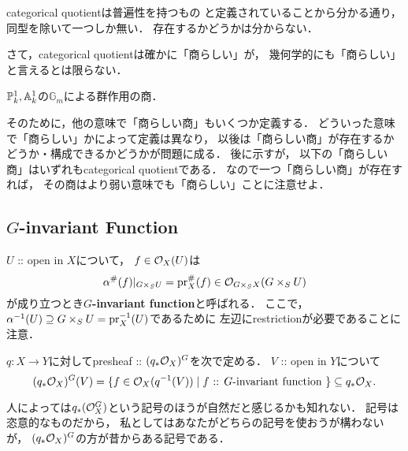 \documentclass[a4paper]{jsarticle}
\newcommand{\Gm}{\mathbb{G}_m}
\begin{document}
    \begin{Remark}
        categorical quotientは普遍性を持つもの
        と定義されていることから分かる通り，
        同型を除いて一つしか無い．
        存在するかどうかは分からない．
    \end{Remark}

    さて，categorical quotientは確かに「商らしい」が，
    幾何学的にも「商らしい」と言えるとは限らない．

    \begin{Example}\label{example:P,A/Gm}
        $\mathbb{P}^1_k, \mathbb{A}^1_k$の$\Gm$による群作用の商．
    \end{Example}

    そのために，他の意味で「商らしい商」もいくつか定義する．
    どういった意味で「商らしい」かによって定義は異なり，
    以後は「商らしい商」が存在するかどうか・構成できるかどうかが問題に成る．
    後に示すが，
    以下の「商らしい商」はいずれもcategorical quotientである．
    なので一つ「商らしい商」が存在すれば，
    その商はより弱い意味でも「商らしい」ことに注意せよ．

    \subsection{\texorpdfstring{$G$}{G}-invariant Function}
    \begin{Def}[\cite{AV}]
        $U$ :: open in $X$について，
        $f \in \mathcal{O}_X(U)$は
        \[ \alpha^{\#}(f)|_{G \times_S U}=\operatorname{pr}_X^{\#}(f) \in \mathcal{O}_{G \times_S X}(G \times_S U) \]
        が成り立つとき\textbf{$G$-invariant function}と呼ばれる．
        ここで，
        $\alpha^{-1}(U) \supseteq G \times_S U=\operatorname{pr}_X^{-1}(U)$であるために
        左辺にrestrictionが必要であることに注意．

        $q: X \to Y$に対してpresheaf :: $(q_* \mathcal{O}_X)^G$を次で定める．
        $V$ :: open in $Y$について
        \[
            (q_* \mathcal{O}_X)^G(V)
            =\{ f \in \mathcal{O}_X(q^{-1}(V)) \mid f \text{ :: $G$-invariant function } \}
            \subseteq q_*\mathcal{O}_X.
        \]
    \end{Def}
    人によっては$q_*(\mathcal{O}_X^G)$という記号のほうが自然だと感じるかも知れない．
    記号は恣意的なものだから，
    私としてはあなたがどちらの記号を使おうが構わないが，
    $(q_* \mathcal{O}_X)^G$の方が昔からある記号である．
\end{document}
